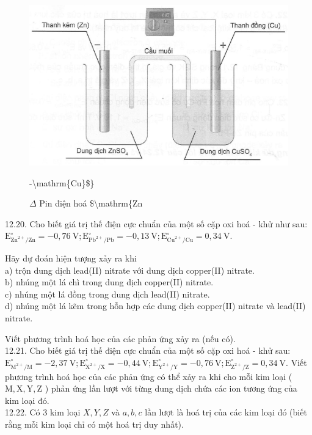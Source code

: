 \documentclass[10pt]{article}
\begin{document}
\begin{figure}[h]
\begin{center}
  \includegraphics[width=\textwidth]{2025_10_23_de6f5713836e4e91b3c8g-079}
\captionsetup{labelformat=empty}
\caption{$\Delta$ Pin điện hoá \$\textbackslash mathrm\{Zn}-\textbackslash mathrm\{Cu\}\$\}\end{center}
\end{figure}

12.20. Cho biết giá trị thế điện cực chuẩn của một số cặp oxi hoá - khử như sau: $\mathrm{E}_{\mathrm{Zn}^{2+} / \mathrm{Zn}}^{\circ}=-0,76 \mathrm{~V} ; \mathrm{E}_{\mathrm{Pb}^{2+} / \mathrm{Pb}}^{\circ}=-0,13 \mathrm{~V} ; \mathrm{E}_{\mathrm{Cu}^{2+} / \mathrm{Cu}}^{\circ}=0,34 \mathrm{~V}$.

Hãy dự đoán hiện tượng xảy ra khi\\
a) trộn dung dịch lead(II) nitrate với dung dịch copper(II) nitrate.\\
b) nhúng một lá chì trong dung dịch copper(II) nitrate.\\
c) nhúng một lá đồng trong dung dịch lead(II) nitrate.\\
d) nhúng một lá kẽm trong hỗn hợp các dung dịch copper(II) nitrate và lead(II) nitrate.

Viết phương trình hoá học của các phản ứng xảy ra (nếu có).\\
12.21. Cho biết giá trị thế điện cực chuẩn của một số cặp oxi hoá - khử sau: $\mathrm{E}_{\mathrm{M}^{2+} / \mathrm{M}}^{\circ}=-2,37 \mathrm{~V} ; \mathrm{E}_{\mathrm{X}^{2+} / \mathrm{X}}^{\circ}=-0,44 \mathrm{~V} ; \mathrm{E}_{\mathrm{Y}^{2+} / \mathrm{Y}}^{\circ}=-0,76 \mathrm{~V} ; \mathrm{E}_{\mathrm{Z}^{2+} / \mathrm{Z}}^{\circ}=0,34 \mathrm{~V}$. Viết phương trình hoá học của các phản ứng có thể xảy ra khi cho mỗi kim loại ( $\mathrm{M}, \mathrm{X}, \mathrm{Y}, \mathrm{Z}$ ) phản ứng lần lượt với từng dung dịch chứa các ion tương ứng của kim loại đó.\\
12.22. Có 3 kim loại $X, Y, Z$ và $a, b, c$ lần lượt là hoá trị của các kim loại đó (biết rằng mỗi kim loại chỉ có một hoá trị duy nhất).
\end{document}

